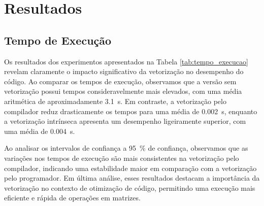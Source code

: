 \documentclass[12pt,a4paper]{article}
\begin{document}
\section{Resultados}

\subsection{Tempo de Execução} \label{sec:tempo_execucao}

Os resultados dos experimentos apresentados na Tabela \ref{tab:tempo_execucao} revelam claramente o impacto significativo da vetorização no desempenho do código. Ao comparar os tempos de execução, observamos que a versão sem vetorização possui tempos consideravelmente mais elevados, com uma média aritmética de aproximadamente \SI{3,1}{\second}. Em contraste, a vetorização pelo compilador reduz drasticamente os tempos para uma média de \SI{0,002}{\second}, enquanto a vetorização intrínseca apresenta um desempenho ligeiramente superior, com uma média de \SI{0,004}{\second}.

Ao analisar os intervalos de confiança a \SI{95}{\percent} de confiança, observamos que as variações nos tempos de execução são mais consistentes na vetorização pelo compilador, indicando uma estabilidade maior em comparação com a vetorização pelo programador. Em última análise, esses resultados destacam a importância da vetorização no contexto de otimização de código, permitindo uma execução mais eficiente e rápida de operações em matrizes.
\end{document}
